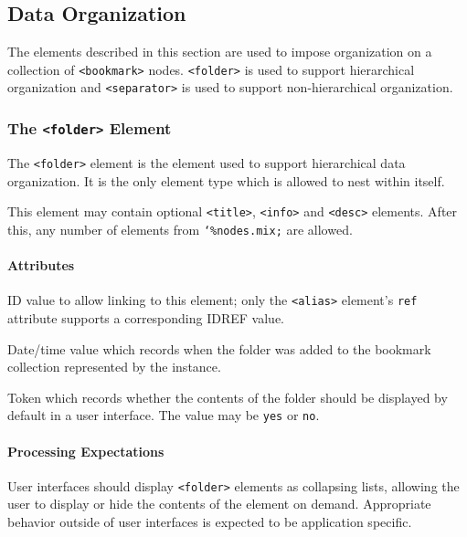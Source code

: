 \documentclass{howto}
\newcommand{\element}[1]{\texttt{<#1>}}
\newcommand{\attribute}[1]{\texttt{#1}}
\newcommand{\nmtoken}[1]{\texttt{#1}}
\newcommand{\paramentity}[1]{\texttt{\char`\%#1;}}
\begin{document}
  \subsection{Data Organization
              \label{data-organization}}

    The elements described in this section are used to impose
    organization on a collection of \element{bookmark} nodes.
    \element{folder} is used to support hierarchical organization and
    \element{separator} is used to support non-hierarchical
    organization.

    \subsubsection{The \element{folder} Element
                   \label{element-folder}}

      The \element{folder} element is the element used to support
      hierarchical data organization.  It is the only element type
      which is allowed to nest within itself.

      This element may contain optional \element{title},
      \element{info} and \element{desc} elements.  After this, any
      number of elements from \paramentity{nodes.mix} are allowed.

      \paragraph*{Attributes}
        \begin{definitions}
          \term{\attribute{id}}
          ID value to allow linking to this element; only the
          \element{alias} element's \attribute{ref} attribute supports
          a corresponding IDREF value.

          \term{\attribute{added}}
          Date/time value which records when the folder was added to
          the bookmark collection represented by the instance.

          \term{\attribute{folded}}
          Token which records whether the contents of the folder
          should be displayed by default in a user interface.  The
          value may be \nmtoken{yes} or \nmtoken{no}.
	\end{definitions}

      \paragraph*{Processing Expectations}
        User interfaces should display \element{folder} elements as
        collapsing lists, allowing the user to display or hide the
        contents of the element on demand.  Appropriate behavior
        outside of user interfaces is expected to be application
        specific.
\end{document}
